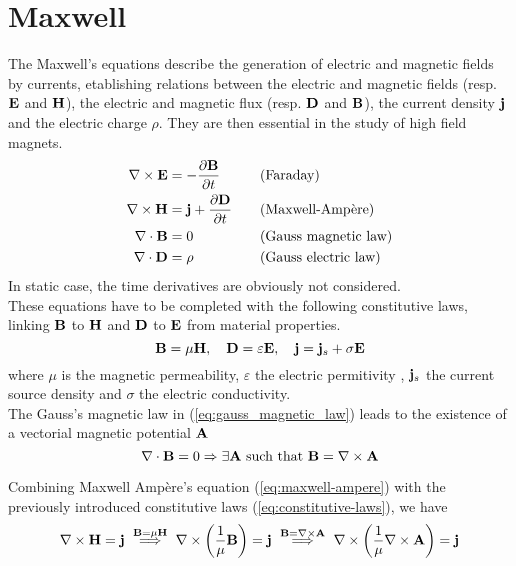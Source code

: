 \section{Maxwell}
The Maxwell's equations describe the generation of electric and magnetic fields
by currents, etablishing relations between the electric and magnetic fields
(resp. $\mathbf{E}$ and $\mathbf{H}$), the electric and magnetic flux (resp. $\mathbf{D}$ and $\mathbf{B}$),
the current density $\mathbf{j}$ and the electric charge $\rho$. They are then
essential in the study of high field magnets.
\begin{alignat}{2}
  \nabla \times \mathbf{E} &= -\frac{\partial \mathbf{B}}{\partial t}
  &&\quad\text{(Faraday)} \label{eq:faraday} \\
  \nabla \times \mathbf{H} &= \mathbf{j} +\frac{\partial \mathbf{D}}{\partial t}
  &&\quad\text{(Maxwell-Ampère)} \label{eq:maxwell-ampere} \\
  \nabla \cdot \mathbf{B} &= 0
  &&\quad\text{(Gauss magnetic law)} \label{eq:gauss_magnetic_law} \\
  \nabla \cdot \mathbf{D} &= \rho
  &&\quad\text{(Gauss electric law)} \label{eq:gauss_electric_law}
\end{alignat}
In static case, the time derivatives are obviously not considered. \\

These equations have to be completed with the following constitutive laws,
linking $\mathbf{B}$ to $\mathbf{H}$ and $\mathbf{D}$ to $\mathbf{E}$ from material properties.
\begin{equation}
  \label{eq:constitutive-laws}
  \mathbf{B} = \mu \mathbf{H}, \quad \mathbf{D} = \varepsilon \mathbf{E}, \quad \mathbf{j} = \mathbf{j}_s + \sigma \mathbf{E}
\end{equation}
where $\mu$ is the magnetic permeability, $\varepsilon$ the electric permitivity
, $\mathbf{j}_s$ the current source density and $\sigma$ the electric conductivity. \\

The Gauss's magnetic law in (\ref{eq:gauss_magnetic_law}) leads to the existence
of a vectorial magnetic potential $\mathbf{A}$
\begin{equation}
  \label{eq:magnetic-potential}
  \nabla\cdot\mathbf{B}=0 \Rightarrow\exists\mathbf{A}\text{ such that }\mathbf{B} = \nabla\times\mathbf{A}
\end{equation}

Combining Maxwell Ampère's equation (\ref{eq:maxwell-ampere}) with the
previously introduced constitutive laws (\ref{eq:constitutive-laws}), we have
\begin{equation}
  \nabla \times \mathbf{H} = \mathbf{j}
    ~\overset{ {\scriptstyle \mathbf{B} = \mu \mathbf{H}} }{ \Longrightarrow }
    ~\nabla \times \left( \frac{1}{\mu} \mathbf{B} \right) = \mathbf{j}
    ~\overset{ {\scriptstyle\mathbf{B} = \nabla \times \mathbf{A}} }{ \Longrightarrow }
    ~\nabla \times \left( \frac{1}{\mu} \nabla \times \mathbf{A} \right) = \mathbf{j}
\end{equation}

